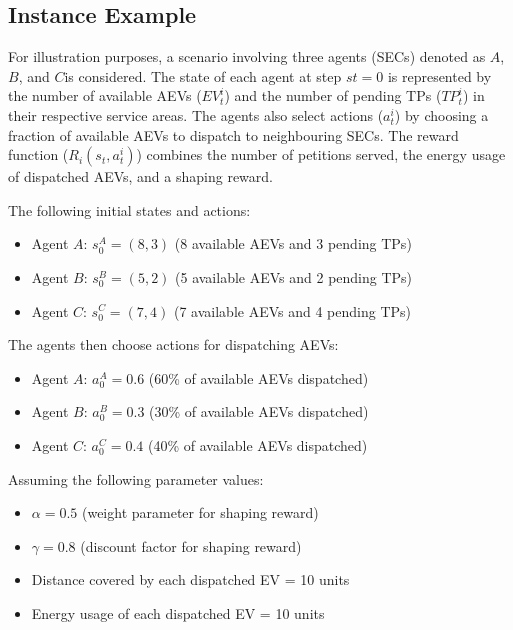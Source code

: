 \subsection{Instance Example}

For illustration purposes, a scenario involving three agents (SECs) denoted as \(A\), \(B\), and \(C\)is considered. The state of each agent at step \(st=0\) is represented by the number of available AEVs (\(EV_t^i\)) and the number of pending TPs (\(TP_t^i\)) in their respective service areas. The agents also select actions (\(a_t^i\)) by choosing a fraction of available AEVs to dispatch to neighbouring SECs. The reward function (\(R_i(s_t, a_t^i)\)) combines the number of petitions served, the energy usage of dispatched AEVs, and a shaping reward.

The following initial states and actions:

\begin{itemize}
    \item Agent \(A\): \(s_0^A = (8, 3)\) (8 available AEVs and 3 pending TPs)
    \item Agent \(B\): \(s_0^B = (5, 2)\) (5 available AEVs and 2 pending TPs)
    \item Agent \(C\): \(s_0^C = (7, 4)\) (7 available AEVs and 4 pending TPs)
\end{itemize}

The agents then choose actions for dispatching AEVs:

\begin{itemize}
    \item Agent \(A\): \(a_0^A = 0.6\) (60\% of available AEVs dispatched)
    \item Agent \(B\): \(a_0^B = 0.3\) (30\% of available AEVs dispatched)
    \item Agent \(C\): \(a_0^C = 0.4\) (40\% of available AEVs dispatched)
\end{itemize}

Assuming the following parameter values:
\begin{itemize}
    \item \(\alpha = 0.5\) (weight parameter for shaping reward)
    \item \(\gamma = 0.8\) (discount factor for shaping reward)
    \item Distance covered by each dispatched EV = 10 units
    \item Energy usage of each dispatched EV = 10 units
\end{itemize}

